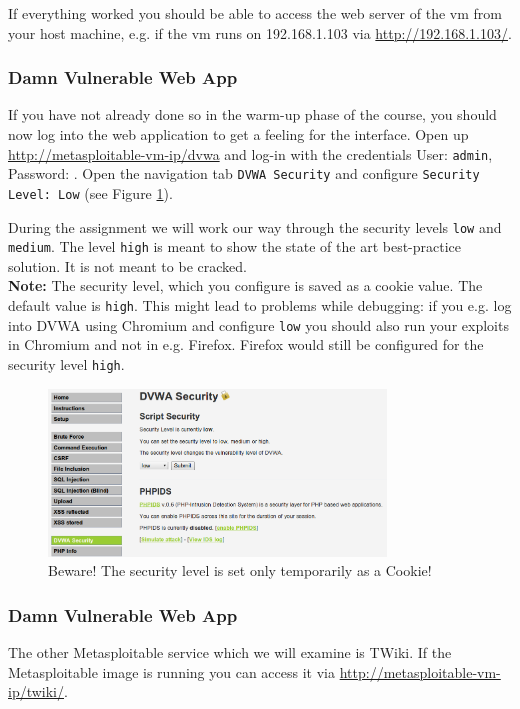 \documentclass{report}
\begin{document}
If everything worked you should be able to access the web server of the
vm from your host machine, e.g. if the vm runs on
192.168.1.103 via
\href{http://192.168.1.103/}{http://192.168.1.103/}.

\subsubsection{Damn Vulnerable Web App}
If you have not already done so in the warm-up phase of the course,
you should now log into the web application to get a feeling for the 
interface.
Open up \href{http://metasploitable-vm-ip/dvwa}{http://metasploitable-vm-ip/dvwa}
and log-in with the credentials User: \texttt{admin}, Password: 
.
Open the navigation tab
\texttt{DVWA Security} and configure \texttt{Security Level: Low} (see
Figure \ref{fig:dvwa0}).

During the assignment we will work our way through the security levels 
\texttt{low} and \texttt{medium}. The level \texttt{high} is meant to show 
the state of the art best-practice solution. It is not meant to be cracked.\\

\textbf{Note:} The security level, which you configure is saved as a cookie 
value. The default value is \texttt{high}. This might lead to problems
while debugging: if you e.g. log into DVWA using Chromium and configure
\texttt{low} you should also run your exploits in Chromium and not 
in e.g. Firefox. Firefox would still be configured for the security level
\texttt{high}.

\begin{figure}[h!]
	\centering
	\includegraphics[width=0.8\textwidth]
		{./images/dvwa-security.png}
	\caption{
		Beware! The security level is set only temporarily as a
		Cookie!
	}
	\label{fig:dvwa0}
\end{figure}

\subsubsection{Damn Vulnerable Web App}
The other Metasploitable service which we will examine is TWiki. If the
Metasploitable image is running you can access it via 
\href{http://metasploitable-vm-ip/twiki}{http://metasploitable-vm-ip/twiki/}.
\end{document}
